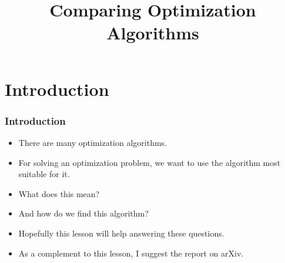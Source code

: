\documentclass[aspectratio=169,mathserif,notheorems]{beamer}%
\title{Comparing Optimization Algorithms}%
\begin{document}
%
\startPresentation%
%
\section{Introduction}%
%
\begin{frame}%
\frametitle{Introduction}%
\begin{itemize}%
\item There are many optimization algorithms.%
\item<2-> For solving an optimization problem, we want to use the algorithm most suitable for it.%
\item<3-> \alert<3>{What does this mean?}%
\item<4-> \alert<4>{And how do we find this algorithm?}%
\item<5-> Hopefully this lesson will help answering these questions.%
\item<6-> As a complement to this lesson, I suggest the report \emph{}\cite{BBDvdBBCEFKLCLIMMNOVWW2020BIOBPAOI} on arXiv.%
\end{itemize}%
\end{frame}%
%
%
\end{document}
